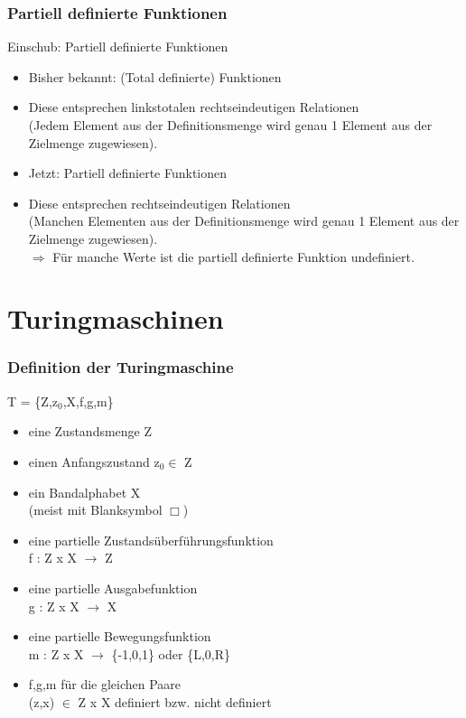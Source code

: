 \documentclass{beamer}
\begin{document}
\begin{frame}
	\frametitle{Partiell definierte Funktionen}
	\begin{block}{Einschub: Partiell definierte Funktionen}
		\begin{itemize}
			\item Bisher bekannt: (Total definierte) Funktionen
			\item Diese entsprechen linkstotalen rechtseindeutigen Relationen\\ (Jedem Element aus der Definitionsmenge wird genau 1 Element aus der Zielmenge zugewiesen).
			\item Jetzt: Partiell definierte Funktionen
			\item Diese entsprechen rechtseindeutigen Relationen\\ (Manchen Elementen aus der Definitionsmenge wird genau 1 Element aus der Zielmenge zugewiesen).\\ $\Rightarrow$ Für manche Werte ist die partiell definierte Funktion undefiniert.
		\end{itemize}
	\end{block}
\end{frame}

\section{Turingmaschinen}
\begin{frame}
	\frametitle{Definition der Turingmaschine}
	\begin{block}{T = \{Z,z$_0$,X,f,g,m\}}
		\begin{itemize}
			\item eine Zustandsmenge Z
			\item einen Anfangszustand z$_0 \in$ Z
			\item ein Bandalphabet X\\ (meist mit Blanksymbol $\Box$) 
			\item eine partielle Zustandsüberführungsfunktion\\
			f : Z x X $\rightarrow$ Z
			\item eine partielle Ausgabefunktion\\
			g : Z x X $\rightarrow$ X
			\item eine partielle Bewegungsfunktion\\
			m : Z x X $\rightarrow$ \{-1,0,1\} oder \{L,0,R\}
			\item f,g,m für die gleichen Paare\\
			(z,x) $\in$ Z x X definiert bzw. nicht definiert
		\end{itemize}	
	\end{block}		
\end{frame}
\end{document}
